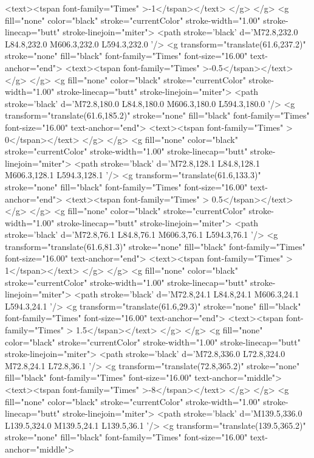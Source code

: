 		<text><tspan font-family="Times" >-1</tspan></text>
	</g>
</g>
<g fill="none" color="black" stroke="currentColor" stroke-width="1.00" stroke-linecap="butt" stroke-linejoin="miter">
	<path stroke='black'  d='M72.8,232.0 L84.8,232.0 M606.3,232.0 L594.3,232.0  '/>	<g transform="translate(61.6,237.2)" stroke="none" fill="black" font-family="Times" font-size="16.00"  text-anchor="end">
		<text><tspan font-family="Times" >-0.5</tspan></text>
	</g>
</g>
<g fill="none" color="black" stroke="currentColor" stroke-width="1.00" stroke-linecap="butt" stroke-linejoin="miter">
	<path stroke='black'  d='M72.8,180.0 L84.8,180.0 M606.3,180.0 L594.3,180.0  '/>	<g transform="translate(61.6,185.2)" stroke="none" fill="black" font-family="Times" font-size="16.00"  text-anchor="end">
		<text><tspan font-family="Times" > 0</tspan></text>
	</g>
</g>
<g fill="none" color="black" stroke="currentColor" stroke-width="1.00" stroke-linecap="butt" stroke-linejoin="miter">
	<path stroke='black'  d='M72.8,128.1 L84.8,128.1 M606.3,128.1 L594.3,128.1  '/>	<g transform="translate(61.6,133.3)" stroke="none" fill="black" font-family="Times" font-size="16.00"  text-anchor="end">
		<text><tspan font-family="Times" > 0.5</tspan></text>
	</g>
</g>
<g fill="none" color="black" stroke="currentColor" stroke-width="1.00" stroke-linecap="butt" stroke-linejoin="miter">
	<path stroke='black'  d='M72.8,76.1 L84.8,76.1 M606.3,76.1 L594.3,76.1  '/>	<g transform="translate(61.6,81.3)" stroke="none" fill="black" font-family="Times" font-size="16.00"  text-anchor="end">
		<text><tspan font-family="Times" > 1</tspan></text>
	</g>
</g>
<g fill="none" color="black" stroke="currentColor" stroke-width="1.00" stroke-linecap="butt" stroke-linejoin="miter">
	<path stroke='black'  d='M72.8,24.1 L84.8,24.1 M606.3,24.1 L594.3,24.1  '/>	<g transform="translate(61.6,29.3)" stroke="none" fill="black" font-family="Times" font-size="16.00"  text-anchor="end">
		<text><tspan font-family="Times" > 1.5</tspan></text>
	</g>
</g>
<g fill="none" color="black" stroke="currentColor" stroke-width="1.00" stroke-linecap="butt" stroke-linejoin="miter">
	<path stroke='black'  d='M72.8,336.0 L72.8,324.0 M72.8,24.1 L72.8,36.1  '/>	<g transform="translate(72.8,365.2)" stroke="none" fill="black" font-family="Times" font-size="16.00"  text-anchor="middle">
		<text><tspan font-family="Times" >-8</tspan></text>
	</g>
</g>
<g fill="none" color="black" stroke="currentColor" stroke-width="1.00" stroke-linecap="butt" stroke-linejoin="miter">
	<path stroke='black'  d='M139.5,336.0 L139.5,324.0 M139.5,24.1 L139.5,36.1  '/>	<g transform="translate(139.5,365.2)" stroke="none" fill="black" font-family="Times" font-size="16.00"  text-anchor="middle">
